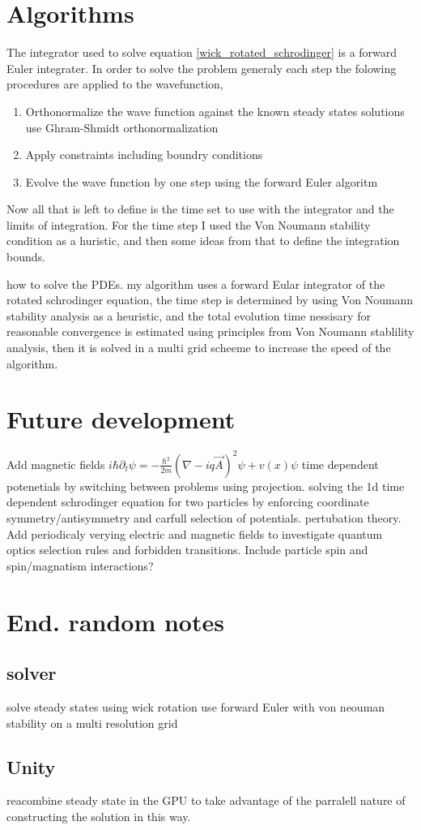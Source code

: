 \documentclass[%
 preprint,
 amsmath, amssymb, aps, pra, 10pt
]{revtex4-2}
\begin{document}
\section{Algorithms}
The integrator used to solve equation \eqref{wick_rotated_schrodinger} is a forward Euler integrater. In order to solve the problem generaly each step the folowing procedures are applied to the wavefunction, 
 
\begin{enumerate}
	\item Orthonormalize the wave function against the known steady states solutions use Ghram-Shmidt orthonormalization
	\item Apply constraints including boundry conditions
	\item Evolve the wave function by one step using the forward Euler algoritm
\end{enumerate}

Now all that is left to define is the time set to use with the integrator and the limits of integration. For the time step I used the Von Noumann stability condition as a huristic, and then some ideas from that to define the integration bounds.

how to solve the PDEs. my algorithm uses a forward Eular integrator of the rotated schrodinger equation, the time step is determined by using Von Noumann stability analysis as a heuristic,
and the total evolution time nessisary for reasonable convergence is estimated using principles from Von Noumann stablility analysis, then it is solved in a multi grid scheeme to increase the speed of the algorithm.

\section{Future development}
Add magnetic fields $i\hbar\partial_t \psi = -\frac{\hbar^2}{2m}(\nabla - iq\vec{A})^2 \psi + v(x)\psi$
time dependent potenetials by switching between problems using projection. solving the 1d time dependent schrodinger equation for two particles by enforcing coordinate symmetry/antisymmetry and carfull selection of potentials. pertubation theory. Add periodicaly verying electric and magnetic fields to investigate quantum optics selection rules and forbidden transitions. Include particle spin and spin/magnatism interactions?

\section{End. random notes}

\subsection{solver}
solve steady states using wick rotation
use forward Euler with von neouman stability
on a multi resolution grid
\subsection{Unity}
reacombine steady state in the GPU to take advantage of the parralell nature of constructing the solution in this way.
\end{document}
